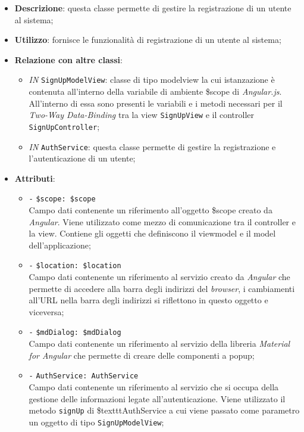 \begin{itemize}
	\item \textbf{Descrizione}: questa classe permette di gestire la registrazione di un utente al sistema;
	\item \textbf{Utilizzo}: fornisce le funzionalità di registrazione di un utente al sistema;
	\item \textbf{Relazione con altre classi}:
	\begin{itemize}
		\item \textit{IN} \texttt{SignUpModelView}: classe di tipo modelview la cui istanzazione è contenuta all'interno della variabile di ambiente \$scope di \textit{Angular.js}. All'interno di essa sono presenti le variabili e i metodi necessari per il \textit{Two-Way Data-Binding} tra la view \texttt{SignUpView} e il controller \texttt{SignUpController};
		\item \textit{IN} \texttt{AuthService}: questa classe permette di gestire la registrazione e l'autenticazione di un utente;
	\end{itemize}
	\item \textbf{Attributi}:
	\begin{itemize}
		\item \texttt{-} \texttt{\$scope: \$scope} \\
		Campo dati contenente un riferimento all’oggetto \$scope creato da \textit{Angular}. Viene utilizzato come mezzo di comunicazione tra il controller e la view. Contiene gli oggetti che definiscono il viewmodel e il model dell’applicazione;
		\item \texttt{-} \texttt{\$location: \$location} \\
		Campo dati contenente un riferimento al servizio creato da \textit{Angular} che permette di accedere alla barra degli indirizzi del \textit{browser}, i cambiamenti all’URL nella barra degli indirizzi si riflettono in questo oggetto e viceversa;
		\item \texttt{-} \texttt{\$mdDialog: \$mdDialog} \\
		Campo dati contenente un riferimento al servizio della libreria \textit{Material for Angular} che permette di creare delle componenti a popup;
		\item \texttt{-} \texttt{AuthService: AuthService} \\
		Campo dati contenente un riferimento al servizio che si occupa della gestione delle informazioni legate all’autenticazione. Viene utilizzato il metodo \texttt{signUp} di \$texttt{AuthService} a cui viene passato come parametro un oggetto di tipo \texttt{SignUpModelView};

\end{itemize}
\end{itemize}
